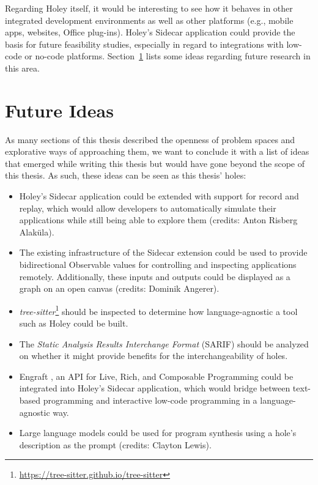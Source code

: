 Regarding Holey itself, it would be interesting to see how it behaves in other integrated development environments as well as other platforms (e.g., mobile apps, websites, Office plug-ins).
Holey's Sidecar application could provide the basis for future feasibility studies, especially in regard to integrations with low-code or no-code platforms.
Section~\ref{sec:discussion-future-ideas} lists some ideas regarding future research in this area.


\section{Future Ideas}
\label{sec:discussion-future-ideas}
As many sections of this thesis described the openness of problem spaces and explorative ways of approaching them, we want to conclude it with a list of ideas that emerged while writing this thesis but would have gone beyond the scope of this thesis.
As such, these ideas can be seen as this thesis' holes:
\begin{itemize}
    \item Holey's Sidecar application could be extended with support for record and replay, which would allow developers to automatically simulate their applications while still being able to explore them (credits: Anton Risberg Alaküla).
    \item The existing infrastructure of the Sidecar extension could be used to provide bidirectional Observable values for controlling and inspecting applications remotely. Additionally, these inputs and outputs could be displayed as a graph on an open canvas (credits: Dominik Angerer).
    \item \emph{tree-sitter}\footnote{\url{https://tree-sitter.github.io/tree-sitter}} should be inspected to determine how language-agnostic a tool such as Holey could be built.
    \item The \emph{Static Analysis Results Interchange Format} (SARIF) should be analyzed on whether it might provide benefits for the interchangeability of holes.
    \item Engraft \cite{horowitz_engraft_2023}, an API for Live, Rich, and Composable Programming could be integrated into Holey's Sidecar application, which would bridge between text-based programming and interactive low-code programming in a language-agnostic way.
    \item Large language models could be used for program synthesis using a hole's description as the prompt (credits: Clayton Lewis).
\end{itemize}



